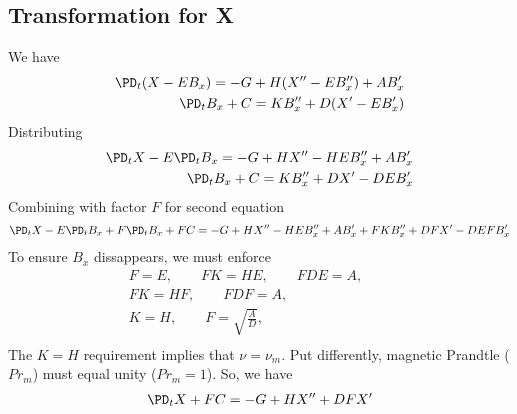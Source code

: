 \documentclass[11pt]{article}
\begin{document}
\subsection{Transformation for X}
We have
\begin{equation}\begin{aligned}
\PD_t (X - E B_x)        = -G+ H (X'' - E B_x'') + A B_x' \\
\PD_t B_x + C = K B_x'' + D (X' - E B_x') \\
\end{aligned} \end{equation}
Distributing
\begin{equation}\begin{aligned}
\PD_t X - E \PD_t B_x = -G+ H X'' - H E B_x'' + A B_x' \\
\PD_t B_x + C = K B_x'' + D X' - D E B_x' \\
\end{aligned} \end{equation}
Combining with factor $F$ for second equation
\begin{equation}\begin{aligned}
\PD_t X - E \PD_t B_x + F \PD_t B_x + FC = -G+ H X'' - H E B_x'' + A B_x' + F K B_x'' + DF X' - D EF B_x'\\
\end{aligned} \end{equation}
To ensure $B_x$ dissappears, we must enforce
\begin{equation}\begin{aligned}
F = E, \qquad
FK = HE, \qquad
FDE = A, \qquad \\
FK = HF, \qquad
FDF = A, \qquad \\
K = H, \qquad
F = \sqrt{\frac{A}{D}}, \qquad \\
\end{aligned} \end{equation}
The $K=H$ requirement implies that $\nu = \nu_m$. Put differently, magnetic Prandtle ($Pr_m$) must equal unity ($Pr_m = 1$). So, we have
\begin{equation}\begin{aligned}
\PD_t X + FC = -G+ H X'' + DF X'\\
\end{aligned} \end{equation}
\end{document}
